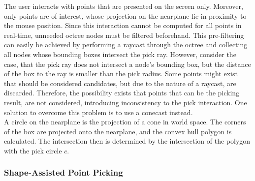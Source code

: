 The user interacts with points that are presented on the screen only. Moreover, only points are of interest, whose projection on the nearplane lie in proximity to the mouse position. Since this interaction cannot be computed for all points in real-time, unneeded octree nodes must be filtered beforehand. This pre-filtering can easily be achieved by performing a raycast through the octree and collecting all nodes whose bounding boxes intersect the pick ray. However, consider the case, that the pick ray does not intersect a node's bounding box, but the distance of the box to the ray is smaller than the pick radius. Some points might exist that should be considered candidates, but due to the nature of a raycast, are discarded. Therefore, the possibility exists that points that can be the picking result, are not considered, introducing inconsistency to the pick interaction. One solution to overcome this problem is to use a conecast instead. 
\\
A circle on the nearplane is the projection of a cone in world space. The corners of the box are projected onto the nearplane, and the convex hull polygon is calculated. The intersection then is determined by the intersection of the polygon with the pick circle $c$. 


\subsubsection{Shape-Assisted Point Picking}
\label {sec:picking_assisted}

